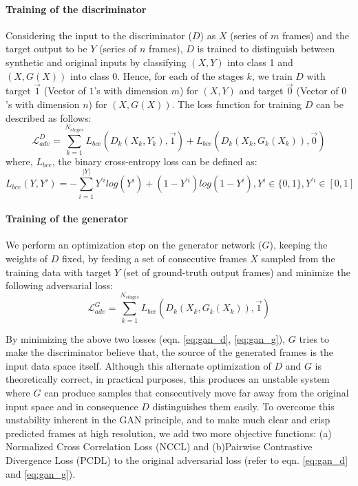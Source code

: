 \documentclass{article}
\begin{document}
  \paragraph{Training of the discriminator} Considering the input to the discriminator ($ D $) as $ X $ (series of $ m $ frames) and the target output to be $ Y $ (series of $ n $ frames), $ D $ is trained to distinguish between synthetic and original inputs by classifying $ (X, Y) $ into class 1 and $ (X, G(X)) $ into class 0. Hence, for each of the stages $ k $, we train $ D $ with target $ \vec{1} $ (Vector of $ 1 $'s with dimension $ m $) for $ (X, Y) $ and target $ \vec{0} $ (Vector of $ 0 $'s with dimension $ n $) for $ (X, G(X)) $. The loss function for training $ D $ can be described as follows:
  \begin{equation}
  	\mathcal{L}_{adv}^D = \sum_{k = 1}^{N_{stages}} L_{bce}(D_k(X_k, Y_k), \vec{1}) + L_{bce}(D_k(X_k, G_k(X_k)), \vec{0})
  	\label{eq:gan_d}
  \end{equation}
  where, $ L_{bce} $, the binary cross-entropy loss can be defined as:
  \begin{equation}
  	L_{bce}(Y, Y') = - \sum_{i = 1}^{|Y|} Y^{'i} log(Y^i) + (1 - Y^{'i}) log (1 - Y^i), Y^i \in \{0,1\}, Y^{'i} \in [0,1]
  	\label{eq:gan_bce} 
  \end{equation}
	
  \paragraph{Training of the generator} We perform an optimization step on the generator network ($ G $), keeping the weights of $ D $ fixed, by feeding a set of consecutive frames $ X $ sampled from the training data with target $ Y $ (set of ground-truth output frames) and minimize the following adversarial loss:
  \begin{equation}
  	\mathcal{L}_{adv}^G = \sum_{k = 1}^{N_{stages}} L_{bce}(D_k(X_k, G_k(X_k)), \vec{1})
  	\label{eq:gan_g}
  \end{equation}
  
  By minimizing the above two losses (eqn. \ref{eq:gan_d}, \ref{eq:gan_g}), $ G $ tries to make the discriminator believe that, the source of the generated frames is the input data space itself. Although this alternate optimization of $ D $ and $ G $ is theoretically correct, in practical purposes, this produces an unstable system where $ G $ can produce samples that consecutively move far away from the original input space and in consequence $ D $ distinguishes them easily. To overcome this unstability inherent in the GAN principle, and to make much clear and crisp predicted frames at high resolution, we add two more objective functions: (a) Normalized Cross Correlation Loss (NCCL) and (b)Pairwise Contrastive Divergence Loss (PCDL) to the original adversarial loss (refer to eqn. \ref{eq:gan_d} and \ref{eq:gan_g}).  
\end{document}
